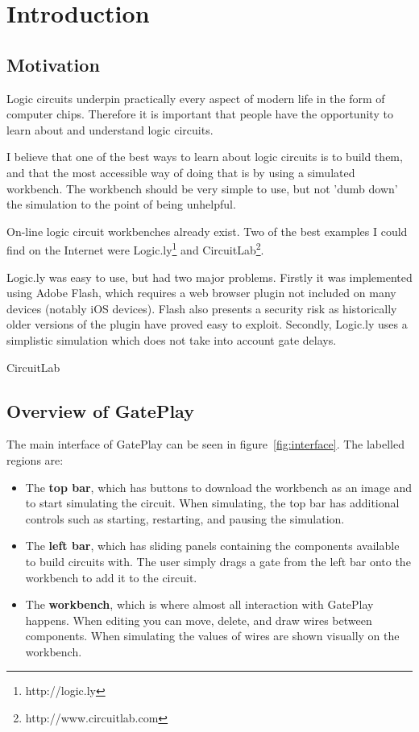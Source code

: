 \chapter{Introduction}

\section{Motivation}
Logic circuits underpin practically every aspect of modern life in the form of computer chips. Therefore it is important that people have the opportunity to learn about and understand logic circuits.

I believe that one of the best ways to learn about logic circuits is to build them, and that the most accessible way of doing that is by using a simulated workbench. The workbench should be very simple to use, but not 'dumb down' the simulation to the point of being unhelpful.

On-line logic circuit workbenches already exist. Two of the best examples I could find on the Internet were Logic.ly\footnote{http://logic.ly} and CircuitLab\footnote{http://www.circuitlab.com}.

Logic.ly was easy to use, but had two major problems. Firstly it was implemented using Adobe Flash, which requires a web browser plugin not included on many devices (notably iOS devices). Flash also presents a security risk as historically older versions of the plugin have proved easy to exploit. Secondly, Logic.ly uses a simplistic simulation which does not take into account gate delays.

CircuitLab



\section{Overview of GatePlay}
The main interface of GatePlay can be seen in figure~\ref{fig:interface}. The labelled regions are:

\begin{itemize}
	\item[1] The \textbf{top bar}, which has buttons to download the workbench as an image and to start simulating the circuit. When simulating, the top bar has additional controls such as starting, restarting, and pausing the simulation.
	\item[2] The \textbf{left bar}, which has sliding panels containing the  components available to build circuits with. The user simply drags a gate from the left bar onto the workbench to add it to the circuit.
	\item[3] The \textbf{workbench}, which is where almost all interaction with GatePlay happens. When editing you can move, delete, and draw wires between components. When simulating the values of wires are shown visually on the workbench.
\end{itemize}

